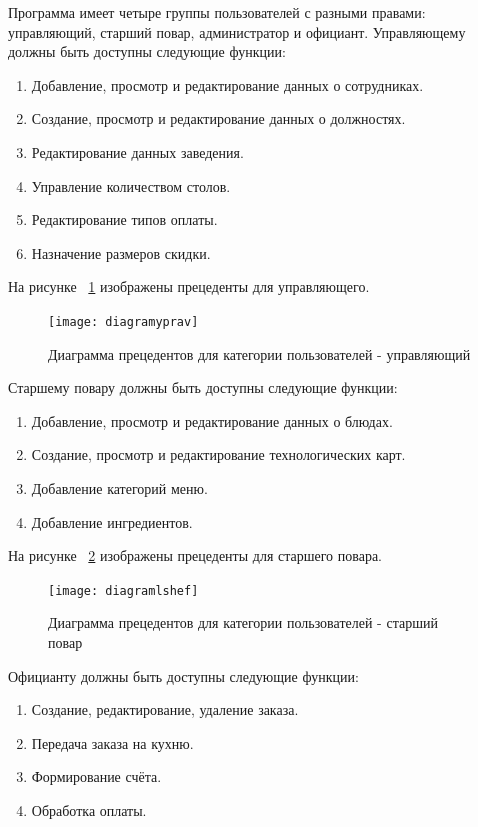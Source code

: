 Программа имеет четыре группы пользователей с разными правами: управляющий, старший повар, администратор и официант. 
\newline
Управляющему должны быть доступны следующие функции:
\begin{enumerate}
	\item Добавление, просмотр и редактирование данных о сотрудниках.
	\item Создание, просмотр и редактирование данных о должностях.
	\item Редактирование данных заведения.
	\item Управление количеством столов.
	\item Редактирование типов оплаты.
	\item Назначение размеров скидки.
\end{enumerate}
На рисунке ~\ref{diagramyprav:image} изображены прецеденты для управляющего.
\begin{figure}[ht]
	\centering
	\texttt{[image: diagramyprav]}
	\caption{Диаграмма прецедентов для категории пользователей - управляющий}
	\label{diagramyprav:image}
\end{figure}
\newline
Старшему повару должны быть доступны следующие функции:
\begin{enumerate}
	\item Добавление, просмотр и редактирование данных о блюдах.
	\item Создание, просмотр и редактирование технологических карт.
	\item Добавление категорий меню.
	\item Добавление ингредиентов.
\end{enumerate}
На рисунке ~\ref{diagramlshef:image} изображены прецеденты для старшего повара.
\begin{figure}[ht]
	\centering
	\texttt{[image: diagramlshef]}
	\caption{Диаграмма прецедентов для категории пользователей - старший повар}
	\label{diagramlshef:image}
\end{figure}
\newpage
Официанту должны быть доступны следующие функции:
\begin{enumerate}
	\item Создание, редактирование, удаление заказа.
	\item Передача заказа на кухню.
	\item Формирование счёта.
	\item Обработка оплаты.
	
\end{enumerate}
